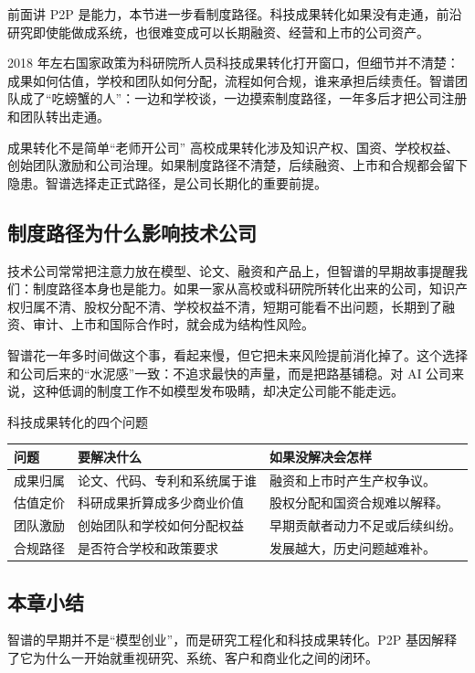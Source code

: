 前面讲 P2P 是能力，本节进一步看制度路径。科技成果转化如果没有走通，前沿研究即使能做成系统，也很难变成可以长期融资、经营和上市的公司资产。

2018 年左右国家政策为科研院所人员科技成果转化打开窗口，但细节并不清楚：成果如何估值，学校和团队如何分配，流程如何合规，谁来承担后续责任。智谱团队成了“吃螃蟹的人”：一边和学校谈，一边摸索制度路径，一年多后才把公司注册和团队转出走通。

\begin{warningbox}{成果转化不是简单“老师开公司”}
高校成果转化涉及知识产权、国资、学校权益、创始团队激励和公司治理。如果制度路径不清楚，后续融资、上市和合规都会留下隐患。智谱选择走正式路径，是公司长期化的重要前提。
\end{warningbox}

\subsection{制度路径为什么影响技术公司}

技术公司常常把注意力放在模型、论文、融资和产品上，但智谱的早期故事提醒我们：制度路径本身也是能力。如果一家从高校或科研院所转化出来的公司，知识产权归属不清、股权分配不清、学校权益不清，短期可能看不出问题，长期到了融资、审计、上市和国际合作时，就会成为结构性风险。

智谱花一年多时间做这个事，看起来慢，但它把未来风险提前消化掉了。这个选择和公司后来的“水泥感”一致：不追求最快的声量，而是把路基铺稳。对 AI 公司来说，这种低调的制度工作不如模型发布吸睛，却决定公司能不能走远。

\begin{knowledgebox}{科技成果转化的四个问题}
\begin{tabularx}{\textwidth}{p{}p{}X}
\toprule
问题 & 要解决什么 & 如果没解决会怎样 \\
\midrule
成果归属 & 论文、代码、专利和系统属于谁 & 融资和上市时产生产权争议。 \\
估值定价 & 科研成果折算成多少商业价值 & 股权分配和国资合规难以解释。 \\
团队激励 & 创始团队和学校如何分配权益 & 早期贡献者动力不足或后续纠纷。 \\
合规路径 & 是否符合学校和政策要求 & 发展越大，历史问题越难补。 \\
\bottomrule
\end{tabularx}
\end{knowledgebox}

\subsection{本章小结}

智谱的早期并不是“模型创业”，而是研究工程化和科技成果转化。P2P 基因解释了它为什么一开始就重视研究、系统、客户和商业化之间的闭环。

